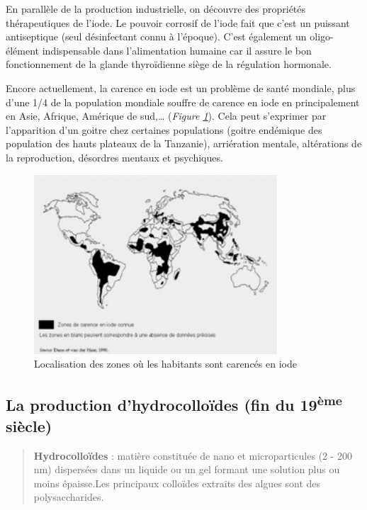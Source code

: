 \documentclass[
]{book}
\begin{document}
En parallèle de la production industrielle, on découvre des propriétés thérapeutiques de l'iode. Le pouvoir corrosif de l'iode fait que c'est un puissant antiseptique (seul désinfectant connu à l'époque). C'est également un oligo-élément indispensable dans l'alimentation humaine car il assure le bon fonctionnement de la glande thyroïdienne siège de la régulation hormonale.

Encore actuellement, la carence en iode est un problème de santé mondiale, plus d'une 1/4 de la population mondiale souffre de carence en iode en principalement en Asie, Afrique, Amérique de sud,\ldots{} (\emph{Figure \ref{fig:iode}}). Cela peut s'exprimer par l'apparition d'un goitre chez certaines populations (goitre endémique des population des hauts plateaux de la Tanzanie), arriération mentale, altérations de la reproduction, désordres mentaux et psychiques.

\begin{figure}

{\centering \includegraphics[width=3.57in]{images/iode} 

}

\caption{Localisation des zones où les habitants sont carencés en iode}\label{fig:iode}
\end{figure}

\hypertarget{la-production-dhydrocollouxefdes-fin-du-19uxe8me-siuxe8cle}{%
\subsection{\texorpdfstring{La production d'hydrocolloïdes (fin du 19\textsuperscript{ème} siècle)}{La production d'hydrocolloïdes (fin du 19ème siècle)}}\label{la-production-dhydrocollouxefdes-fin-du-19uxe8me-siuxe8cle}}

\begin{quote}
\textbf{Hydrocolloïdes} : matière constituée de nano et microparticules (2 - 200 nm) dispersées dans un liquide ou un gel formant une solution plus ou moins épaisse.Les principaux colloïdes extraits des algues sont des polysaccharides.
\end{quote}
\end{document}
